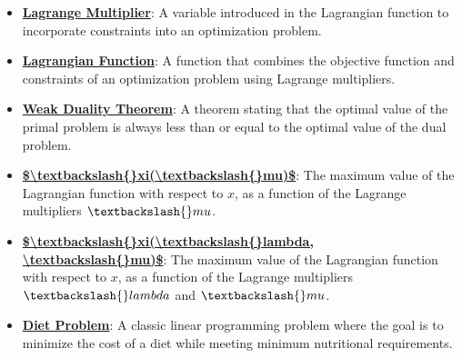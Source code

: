 \documentclass{article}%
\begin{document}
\begin{itemize}[leftmargin=*]%
\item \href{https://www.math.purdue.edu/~yipn/421/2024-09-17-DualityGeneral.pdf#page=2}{\textbf{Lagrange Multiplier}}: A variable introduced in the Lagrangian function to incorporate constraints into an optimization problem.%
\item \href{https://www.math.purdue.edu/~yipn/421/2024-09-17-DualityGeneral.pdf#page=2}{\textbf{Lagrangian Function}}: A function that combines the objective function and constraints of an optimization problem using Lagrange multipliers.%
\item \href{https://www.math.purdue.edu/~yipn/421/2024-09-17-DualityGeneral.pdf#page=5}{\textbf{Weak Duality Theorem}}: A theorem stating that the optimal value of the primal problem is always less than or equal to the optimal value of the dual problem.%
\item \href{https://www.math.purdue.edu/~yipn/421/2024-09-17-DualityGeneral.pdf#page=3}{\textbf{\$\textbackslash{}textbackslash\{\}xi(\textbackslash{}textbackslash\{\}mu)\$}}: The maximum value of the Lagrangian function with respect to $x$, as a function of the Lagrange multipliers $\textbackslash{}mu$.%
\item \href{https://www.math.purdue.edu/~yipn/421/2024-09-17-DualityGeneral.pdf#page=8}{\textbf{\$\textbackslash{}textbackslash\{\}xi(\textbackslash{}textbackslash\{\}lambda, \textbackslash{}textbackslash\{\}mu)\$}}: The maximum value of the Lagrangian function with respect to $x$, as a function of the Lagrange multipliers $\textbackslash{}lambda$ and $\textbackslash{}mu$.%
\end{itemize}%
\begin{itemize}[leftmargin=*]%
\item \href{https://www.math.purdue.edu/~yipn/421/2024-09-19-DualityExamples.pdf#page=2}{\textbf{Diet Problem}}: A classic linear programming problem where the goal is to minimize the cost of a diet while meeting minimum nutritional requirements.%
\end{itemize}%
\end{document}
